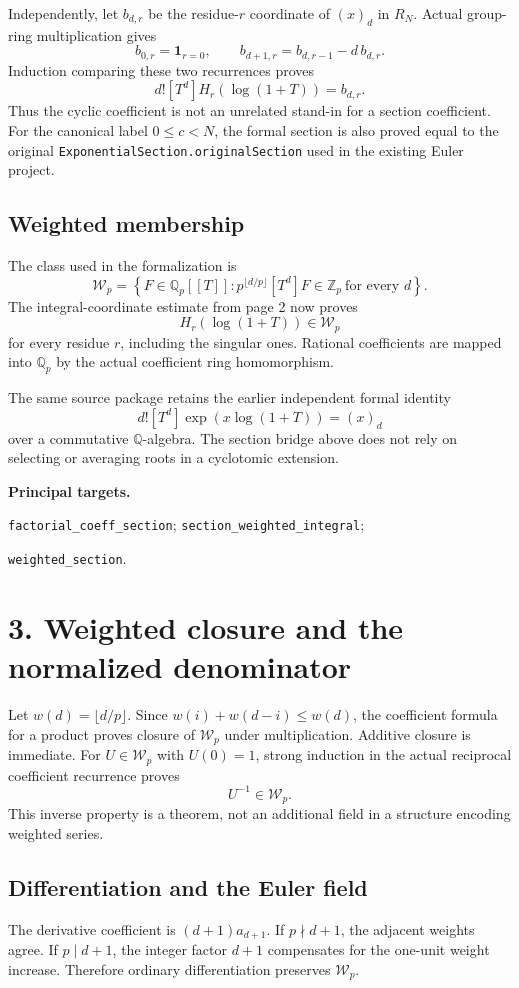 \documentclass[11pt]{article}
\newcommand{\Z}{\mathbb Z}\newcommand{\Q}{\mathbb Q}\newcommand{\N}{\mathbb N}\newcommand{\F}{\mathbb F}
\newcommand{\Wp}{\mathcal W_p}\newcommand{\ord}{\operatorname{ord}}
\newcommand{\coef}[2]{[#1^{#2}]}
\begin{document}
Independently, let $b_{d,r}$ be the residue-$r$ coordinate of $(x)_d$ in $R_N$. Actual group-ring multiplication gives
\[
 b_{0,r}=\mathbf1_{r=0},\qquad
 b_{d+1,r}=b_{d,r-1}-d\,b_{d,r}.
\]
Induction comparing these two recurrences proves
\[
 \boxed{d!\coef{T}{d}H_r(\log(1+T))=b_{d,r}.}
\]
Thus the cyclic coefficient is not an unrelated stand-in for a section coefficient. For the canonical label $0\le c<N$, the formal section is also proved equal to the original \texttt{ExponentialSection.}\allowbreak\texttt{originalSection} used in the existing Euler project.

\subsection*{Weighted membership}
The class used in the formalization is
\[
 \Wp=\left\{F\in\Q_p[[T]]:
 p^{\lfloor d/p\rfloor}\coef{T}{d}F\in\Z_p\ \text{for every }d\right\}.
\]
The integral-coordinate estimate from page 2 now proves
\[
 \boxed{H_r(\log(1+T))\in\Wp}
\]
for every residue $r$, including the singular ones. Rational coefficients are mapped into $\Q_p$ by the actual coefficient ring homomorphism.

The same source package retains the earlier independent formal identity
\[
 d!\coef{T}{d}\exp(x\log(1+T))=(x)_d
\]
over a commutative $\Q$-algebra. The section bridge above does not rely on selecting or averaging roots in a cyclotomic extension.

\textbf{Principal targets.}\par \texttt{factorial\_coeff\_section}; \texttt{section\_weighted\_integral};\par \texttt{weighted\_section}.
\newpage
\section*{3. Weighted closure and the normalized denominator}
Let $w(d)=\lfloor d/p\rfloor$. Since $w(i)+w(d-i)\le w(d)$, the coefficient formula for a product proves closure of $\Wp$ under multiplication. Additive closure is immediate. For $U\in\Wp$ with $U(0)=1$, strong induction in the actual reciprocal coefficient recurrence proves
\[
 \boxed{U^{-1}\in\Wp.}
\]
This inverse property is a theorem, not an additional field in a structure encoding weighted series.

\subsection*{Differentiation and the Euler field}
The derivative coefficient is $(d+1)a_{d+1}$. If $p\nmid d+1$, the adjacent weights agree. If $p\mid d+1$, the integer factor $d+1$ compensates for the one-unit weight increase. Therefore ordinary differentiation preserves $\Wp$.
\end{document}
